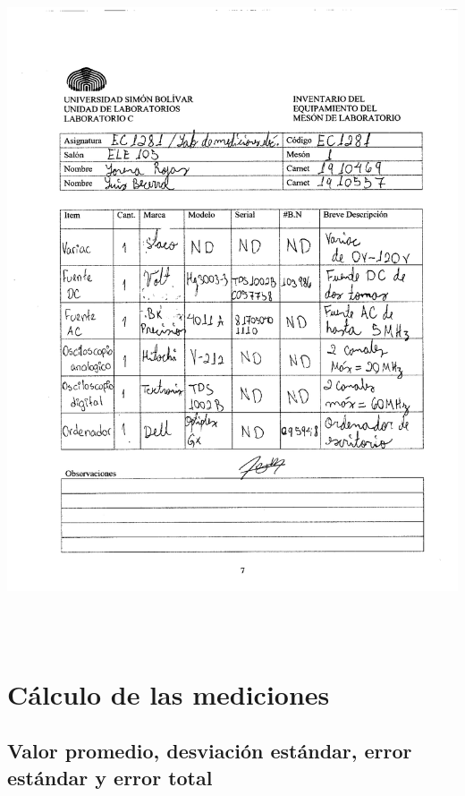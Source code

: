 \documentclass[12pt]{article}
\begin{document}
	\includegraphics[width=15cm,height=20cm]{anexo6}\\
	
	\newpage
	
	\section{Cálculo de las mediciones}
	
	\subsection{Valor promedio, desviación estándar, error estándar y error total}
	
\end{document}
